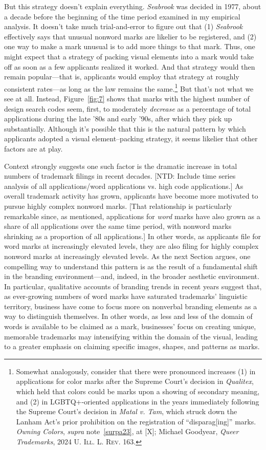 \documentclass[letterpaper, 11pt, oneside]{article}
\begin{document}
But this strategy doesn't explain everything. \textit{Seabrook} was decided in 1977, about a decade before the beginning of the time period examined in my empirical analysis. It doesn't take much trial-and-error to figure out that (1) \textit{Seabrook} effectively says that unusual nonword marks are likelier to be registered, and (2) one way to make a mark unusual is to add more things to that mark. Thus, one might expect that a strategy of packing visual elements into a mark would take off as soon as a few applicants realized it worked. And that strategy would then remain popular—that is, applicants would employ that strategy at roughly consistent rates—as long as the law remains the same.\footnote{Somewhat analogously, consider that there were pronounced increases (1) in applications for color marks after the Supreme Court's decision in \textit{Qualitex}, which held that colors could be marks upon a showing of secondary meaning, and (2) in LGBTQ+-oriented applications in the years immediately following the Supreme Court's decision in \textit{Matal v. Tam}, which struck down the Lanham Act's prior prohibition on the registration of ``disparag[ing]'' marks. \textit{Owning Colors}, \textit{supra} note~\ref{surpa23}, at [X]; Michael Goodyear, \textit{Queer Trademarks}, 2024 \textsc{U. Ill. L. Rev.} 163.} But that's not what we see at all. Instead, Figure~\ref{fig:7} shows that marks with the highest number of design search codes seem, first, to moderately \textit{decrease} as a percentage of total applications during the late '80s and early '90s, after which they pick up substantially. Although it's possible that this is the natural pattern by which applicants adopted a visual element–packing strategy, it seems likelier that other factors are at play.

Context strongly suggests one such factor is the dramatic increase in total numbers of trademark filings in recent decades. [NTD: Include time series analysis of all applications/word applications vs. high code applications.] As overall trademark activity has grown, applicants have become more motivated to pursue highly complex nonword marks. [That relationship is particularly remarkable since, as mentioned, applications for \emph{word} marks have also grown as a share of all applications over the same time period, with nonword marks shrinking as a proportion of all applications.] In other words, as applicants file for word marks at increasingly elevated levels, they are also filing for highly complex nonword marks at increasingly elevated levels. As the next Section argues, one compelling way to understand this pattern is as the result of a fundamental shift in the branding environment—and, indeed, in the broader aesthetic environment. In particular, qualitative accounts of branding trends in recent years suggest that, as ever-growing numbers of word marks have saturated trademarks' linguistic territory, business have come to focus more on nonverbal branding elements as a way to distinguish themselves. In other words, as less and less of the domain of words is available to be claimed as a mark, businesses' focus on creating unique, memorable trademarks may intensifying within the domain of the visual, leading to a greater emphasis on claiming specific images, shapes, and patterns as marks.
\end{document}
